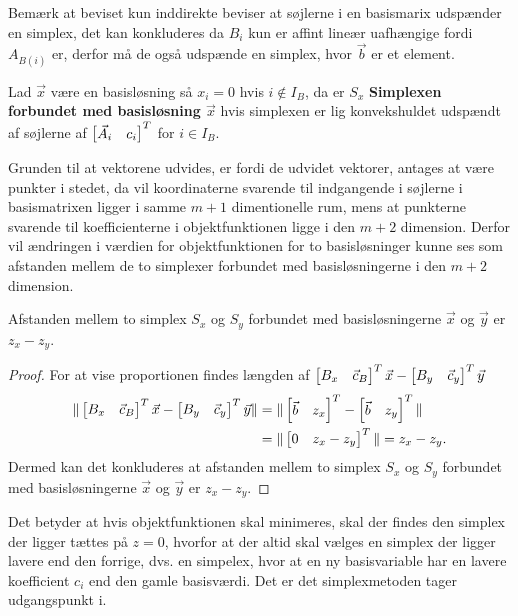 Bemærk at beviset kun inddirekte beviser at søjlerne i en basismarix udspænder en simplex, det kan konkluderes da $B_i$ kun er affint lineær uafhængige fordi $A_{B(i)}$ er, derfor må de også udspænde en simplex, hvor $\vec{b}$ er et element.
\begin{defn}
Lad $\vec{x}$ være en basisløsning så $x_i = 0$ hvis $i \notin I_B$, da er $S_x$ \textbf{Simplexen forbundet med basisløsning $\vec{x}$} hvis simplexen er lig konvekshuldet udspændt af søjlerne af $\begin{bmatrix} \vec{A}_i & c_i \end{bmatrix}^T$ for $i \in I_B$.
\end{defn}
Grunden til at vektorene udvides, er fordi de udvidet vektorer, antages at være punkter i stedet, da vil koordinaterne svarende til indgangende i søjlerne i basismatrixen ligger i samme $m+1$ dimentionelle rum, mens at punkterne svarende til koefficienterne i objektfunktionen ligge i den $m+2$ dimension.  
Derfor vil ændringen i værdien for objektfunktionen for to basisløsninger kunne ses som afstanden mellem de to simplexer forbundet med basisløsningerne i den $m+2$ dimension.
\begin{prop}
Afstanden mellem to simplex $S_x$ og $S_y$ forbundet med basisløsningerne $\vec{x}$ og $\vec{y}$ er $z_x - z_y$.
\end{prop}
\begin{proof}
For at vise proportionen findes længden af $\begin{bmatrix} B_x & \vec{c}_B \end{bmatrix}^T \vec{x} - \begin{bmatrix} B_y & \vec{c}_y \end{bmatrix}^T \vec{y}$
\begin{align*}
 \Vert \begin{bmatrix} B_x & \vec{c}_B \end{bmatrix}^T \vec{x} - \begin{bmatrix} B_y & \vec{c}_y \end{bmatrix}^T \vec{y} \Vert & =  \Vert \begin{bmatrix} \vec{b} & z_x \end{bmatrix}^T  - \begin{bmatrix} \vec{b} & z_y \end{bmatrix}^T  \Vert
 \\ & = \Vert \begin{bmatrix} 0 & z_x - z_y \end{bmatrix}^T \Vert = z_x - z_y.
\end{align*}
Dermed kan det konkluderes at afstanden mellem to simplex $S_x$ og $S_y$ forbundet med basisløsningerne $\vec{x}$ og $\vec{y}$ er $z_x - z_y$.
\end{proof}
Det betyder at hvis objektfunktionen skal minimeres, skal der findes den simplex der ligger tættes på $z = 0$, hvorfor at der altid skal vælges en simplex der ligger lavere end den forrige, dvs. en simpelex, hvor at en ny basisvariable har en lavere koefficient $c_i$ end den gamle basisværdi.
Det er det simplexmetoden tager udgangspunkt i.

